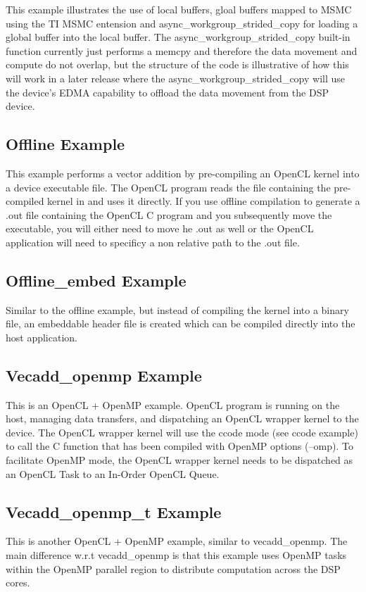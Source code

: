 \documentclass[10pt]{article}
\begin{document}
This example illustrates the use of local buffers, gloal buffers mapped to MSMC using the TI MSMC entension and
async\_workgroup\_strided\_copy for loading a global buffer into the local
buffer.  The async\_workgroup\_strided\_copy built-in function currently just
performs a memcpy and therefore the data movement and compute do not overlap, but the
structure of the code is illustrative of how this will work in a later release where the async\_workgroup\_strided\_copy will use the device's EDMA capability to offload the data movement from the DSP device.

\subsection{Offline Example}
This example performs a vector addition by pre-compiling an OpenCL kernel into a
device executable file. The OpenCL program reads the file containing the
pre-compiled kernel in and uses it directly.  If you use offline compilation
to generate a .out file containing the OpenCL C program and you subsequently
move the executable, you will either need to move he .out as well or the
OpenCL application will need to specificy a non relative path to the .out
file.

\subsection{Offline\_embed Example}
Similar to the offline example, but instead of compiling the kernel into a
binary file, an embeddable header file is created which can be compiled
directly into the host application.


\subsection{Vecadd\_openmp Example}\label{vecaddopenmp}
This is an OpenCL  + OpenMP example.  OpenCL program is running on the host, 
managing data transfers, and dispatching an OpenCL wrapper kernel to the 
device.  The OpenCL wrapper kernel will use the ccode mode (see ccode example) 
to call the C function that has been compiled with OpenMP options (--omp).  
To facilitate OpenMP mode, the OpenCL wrapper kernel needs to be dispatched as 
an OpenCL Task to an In-Order OpenCL Queue.


\subsection{Vecadd\_openmp\_t Example}\label{vecaddopenmpt}
This is another OpenCL + OpenMP example, similar to vecadd\_openmp. The main
difference w.r.t vecadd\_openmp is that this example uses OpenMP tasks within 
the OpenMP parallel region to distribute computation across the DSP cores.
\end{document}
